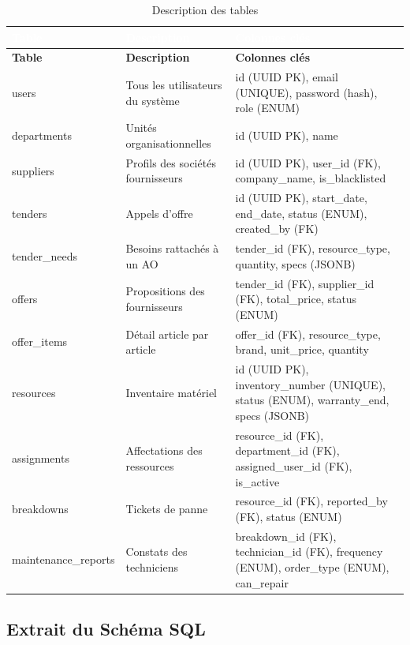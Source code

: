 \documentclass[12pt,a4paper]{report}
\begin{document}
\begin{longtable}{|L{3.5cm}|L{5cm}|L{5cm}|}
\caption{Description des tables} \\
\hline
{}\textcolor{white}{\textbf{Table}} & \textcolor{white}{\textbf{Description}} & \textcolor{white}{\textbf{Colonnes clés}} \\
\hline
\endfirsthead
\hline
\textbf{Table} & \textbf{Description} & \textbf{Colonnes clés} \\
\hline
\endhead
users & Tous les utilisateurs du système & id (UUID PK), email (UNIQUE), password (hash), role (ENUM) \\
\hline
departments & Unités organisationnelles & id (UUID PK), name \\
\hline
suppliers & Profils des sociétés fournisseurs & id (UUID PK), user\_id (FK), company\_name, is\_blacklisted \\
\hline
tenders & Appels d'offre & id (UUID PK), start\_date, end\_date, status (ENUM), created\_by (FK) \\
\hline
tender\_needs & Besoins rattachés à un AO & tender\_id (FK), resource\_type, quantity, specs (JSONB) \\
\hline
offers & Propositions des fournisseurs & tender\_id (FK), supplier\_id (FK), total\_price, status (ENUM) \\
\hline
offer\_items & Détail article par article & offer\_id (FK), resource\_type, brand, unit\_price, quantity \\
\hline
resources & Inventaire matériel & id (UUID PK), inventory\_number (UNIQUE), status (ENUM), warranty\_end, specs (JSONB) \\
\hline
assignments & Affectations des ressources & resource\_id (FK), department\_id (FK), assigned\_user\_id (FK), is\_active \\
\hline
breakdowns & Tickets de panne & resource\_id (FK), reported\_by (FK), status (ENUM) \\
\hline
maintenance\_reports & Constats des techniciens & breakdown\_id (FK), technician\_id (FK), frequency (ENUM), order\_type (ENUM), can\_repair \\
\hline
\end{longtable}

\subsection{Extrait du Schéma SQL}
\end{document}
